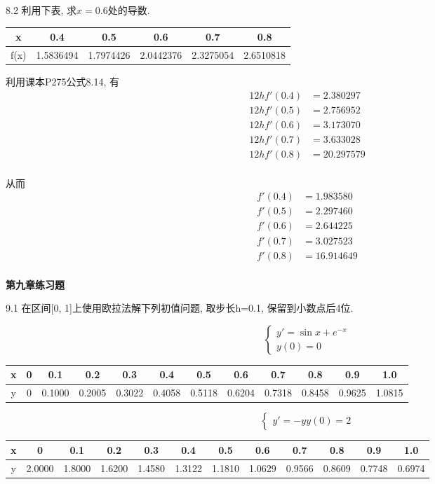 \documentclass[a4paper, 10pt]{article}
\begin{document}
\begin{CJK}{UTF8}{gbsn}
8.2
利用下表, 求$x=0.6$处的导数.\\

\begin{tabular}{c| c c c c c}
\hline
x    & 0.4       & 0.5       & 0.6       & 0.7       & 0.8 \\
\hline
f(x) & 1.5836494 & 1.7974426 & 2.0442376 & 2.3275054 & 2.6510818 \\
\hline
\end{tabular}

利用课本P275公式8.14, 有 \\

\begin{align*}
	12hf'(0.4) & =  2.380297 \\
	12hf'(0.5) & =  2.756952 \\
	12hf'(0.6) & =  3.173070 \\
	12hf'(0.7) & =  3.633028 \\
	12hf'(0.8) & = 20.297579 \\
\end{align*}

从而 \\

\begin{align*}
	f'(0.4) & =  1.983580 \\
	f'(0.5) & =  2.297460 \\
	f'(0.6) & =  2.644225 \\
	f'(0.7) & =  3.027523 \\
	f'(0.8) & = 16.914649 \\
\end{align*}

\textbf{第九章练习题}

9.1
在区间[0, 1]上使用欧拉法解下列初值问题, 取步长h=0.1, 保留到小数点后4位.

\begin{equation*}
	\begin{cases}
		y' = \sin{x}+e^{-x} \\
		y(0) = 0
	\end{cases}
\end{equation*}
\begin{tabular}{c|c c c c c c c c c c c}
\hline
x & 0 & 0.1 & 0.2 & 0.3 & 0.4 & 0.5 & 0.6 & 0.7 & 0.8 & 0.9 & 1.0 \\
\hline
y & 0 & 0.1000 & 0.2005 & 0.3022 & 0.4058 & 0.5118 & 0.6204 & 0.7318 & 0.8458 & 0.9625 & 1.0815 \\
\hline
\end{tabular}
\begin{equation*}
	\begin{cases}
		y' = -y
		y(0) = 2
	\end{cases}
\end{equation*}
\begin{tabular}{c|c c c c c c c c c c c}
\hline
x & 0 & 0.1 & 0.2 & 0.3 & 0.4 & 0.5 & 0.6 & 0.7 & 0.8 & 0.9 & 1.0 \\
\hline
y & 2.0000 & 1.8000 & 1.6200 & 1.4580 & 1.3122 & 1.1810 & 1.0629 & 0.9566 & 0.8609 & 0.7748 & 0.6974 \\
\hline
\end{tabular}


\end{CJK}
\end{document}
